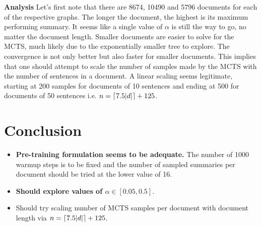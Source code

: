 \vspace{10pt}

\noindent\textbf{Analysis}
Let's first note that there are 8674, 10490 and 5796 documents for each of the respective graphs.
The longer the document, the highest is its maximum performing summary.
It seems like a single value of $\alpha$ is still the way to go, no matter the document length.
Smaller documents are easier to solve for the MCTS, much likely due to the exponentially smaller tree to explore.
The convergence is not only better but also faster for smaller documents.
This implies that one should attempt to scale the number of samples made by the MCTS with the number of sentences in a document.
A linear scaling seems legitimate, starting at 200 samples for documents of 10 sentences and ending at 500 for documents of 50 sentences i.e. $n = \lceil7.5|d|\rceil + 125$.

\section*{Conclusion}

\begin{itemize}
    \item \textbf{Pre-training formulation seems to be adequate.} The number of 1000 warmup steps is to be fixed and the number of sampled summaries per document should be tried at the lower value of 16.
    \item \textbf{Should explore values of $\alpha \in [0.05, 0.5]$}.
    \item Should try scaling number of MCTS samples per document with document length via $n = \lceil7.5|d|\rceil + 125$.
\end{itemize}
